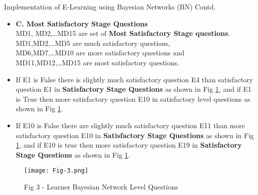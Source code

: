 \documentclass{beamer}
\begin{document}
\begin{frame}
\begin{block}{Implementation of E-Learning using Bayesian Networks (BN) Contd.}
\begin{itemize}
    \item \textbf{C. Most Satisfactory Stage Questions} \\
    MD1, MD2,…MD15 are set of \textbf{Most Satisfactory Stage questions}. \\
    MD1,MD2,…MD5 are much satisfactory questions, \\
    MD6,MD7,…MD10 are more satisfactory questions and \\
    MD11,MD12,…MD15 are most satisfactory questions.
    \item If E1 is False there is slightly much satisfactory question E4 than satisfactory question E1 in \textbf{Satisfactory Stage Questions} as shown in Fig \ref{Fig-3}, and if E1 is True then more satisfactory question E10 in satisfactory level questions as shown in Fig \ref{Fig-3}.
    \item If E10 is False there are slightly much satisfactory question E11 than more satisfactory question E10 in \textbf{Satisfactory Stage Questions} as shown in Fig \ref{Fig-3}, and if E10 is true then more satisfactory question E19 in \textbf{Satisfactory Stage Questions} as shown in Fig \ref{Fig-3}.
\end{itemize}
\end{block}
\end{frame}

\begin{frame}
        \begin{figure}[ht]
            \centering
            \texttt{[image: Fig-3.png]}
            \caption{Fig 3 - Learner Bayesian Network Level Questions}
            \label{Fig-3}
        \end{figure}
\end{frame}
\end{document}
